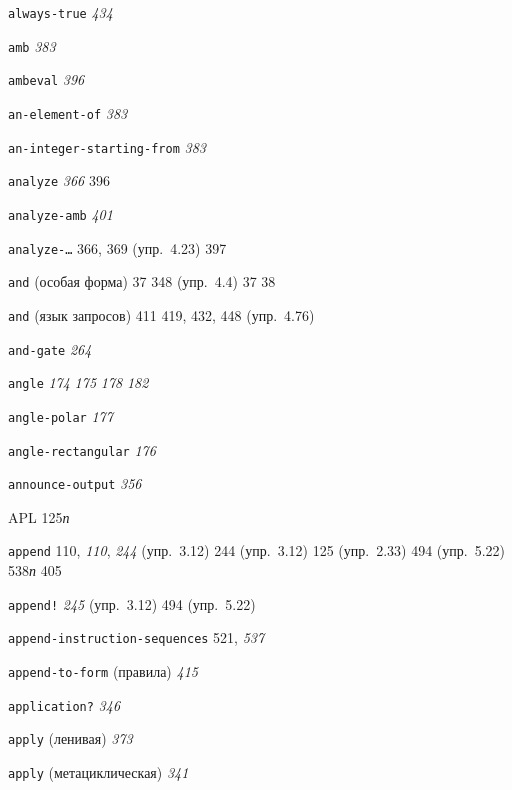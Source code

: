 \begin{theindex}
\item {\texttt{always-true}} {\it 434}
\item {\texttt{amb}} {\it 383}
\item {\texttt{ambeval}} {\it 396}
\item {\texttt{an-element-of}} {\it 383}
\item {\texttt{an-integer-starting-from}} {\it 383}
\item {\texttt{analyze}}
   {\it 366}
   396
\item {\texttt{analyze-amb}} {\it 401}
\item {\texttt{analyze-\ldots}}
   366, 369 (упр.~4.23)
   397
\item {\texttt{and} (особая форма)} 37
   348 (упр.~4.4)
   37
   38
\item {\texttt{and} (язык запросов)} 411
   419, 432, 448 (упр.~4.76)
\item {\texttt{and-gate}} {\it 264}
\item {\texttt{angle}}
   {\it 174}
   {\it 175}
   {\it 178}
   {\it 182}
\item {\texttt{angle-polar}} {\it 177}
\item {\texttt{angle-rectangular}} {\it 176}
\item {\texttt{announce-output}} {\it 356}
\item {APL} 125{\it п}
\item {\texttt{append}} 110, {\it 110}, {\it 244} (упр.~3.12)
   244 (упр.~3.12)
   125 (упр.~2.33)
   494 (упр.~5.22)
   538{\it п}
   405
\item {\texttt{append!}} {\it 245} (упр.~3.12)
   494 (упр.~5.22)
\item {\texttt{append-instruction-sequences}} 521, {\it 537}
\item {\texttt{append-to-form} (правила)} {\it 415}
\item {\texttt{application?}} {\it 346}
\item {\texttt{apply} (ленивая)} {\it 373}
\item {\texttt{apply} (метациклическая)} {\it 341}

\end{theindex}
